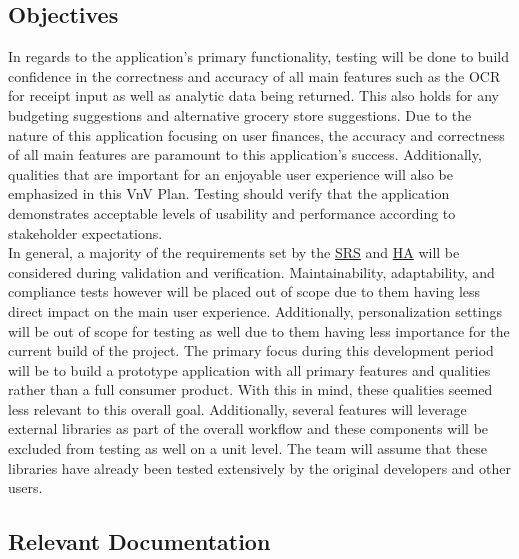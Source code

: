 \documentclass[12pt, titlepage]{article}
\begin{document}
\subsection{Objectives}

In regards to the application's primary functionality, testing will be done to build confidence
in the correctness and accuracy of all main features such as the OCR for receipt input as well as analytic
data being returned. This also holds for any budgeting suggestions and alternative grocery store suggestions.
Due to the nature of this application focusing on user finances, the accuracy and correctness of all
main features are paramount to this application's success.
Additionally, qualities that are important for an enjoyable user experience
will also be emphasized in this VnV Plan. Testing should verify that the application demonstrates
acceptable levels of usability and performance according to stakeholder expectations. \\

In general, a majority of the requirements set by the
\href{https://github.com/r-yeh/grocery-spending-tracker/blob/master/docs/SRS/SRS.pdf}{SRS} and
\href{https://github.com/r-yeh/grocery-spending-tracker/blob/master/docs/HazardAnalysis/HazardAnalysis.pdf}{HA} will be considered
during validation and verification. Maintainability, adaptability, and compliance tests however will be placed out of scope
due to them having less direct impact on the main user experience. Additionally, personalization settings
will be out of scope for testing as well due to them having less importance for the current build of the project. The primary focus during
this development period will be to build a prototype application with all primary features and qualities rather than a
full consumer product. With this in mind, these qualities seemed less relevant to this overall goal.
Additionally, several features will leverage external libraries as part of the overall workflow and these components will
be excluded from testing as well on a unit level. The team will assume that these libraries have already
been tested extensively by the original developers and other users.

\subsection{Relevant Documentation}

\end{document}
